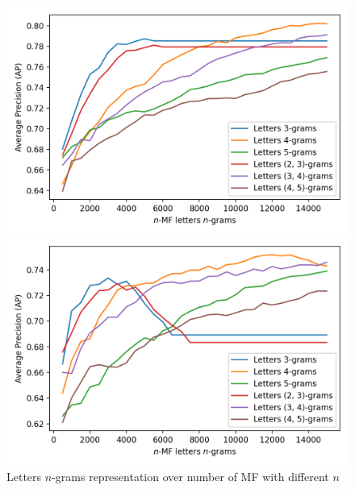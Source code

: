 \begin{figure}
  \caption{Letters $n$-grams representation over number of MF with different $n$}
  \label{fig:letter_ngrams}

  \label{fig:letter_ngrams_oxquarry}
  \includegraphics[width=\linewidth]{img/letter_ngrams_oxquarry.png}

  \vspace{0.5cm}

  \label{fig:letter_ngrams_brunet}
  \includegraphics[width=\linewidth]{img/letter_ngrams_brunet.png}

  \vspace{0.5cm}


\end{figure}
